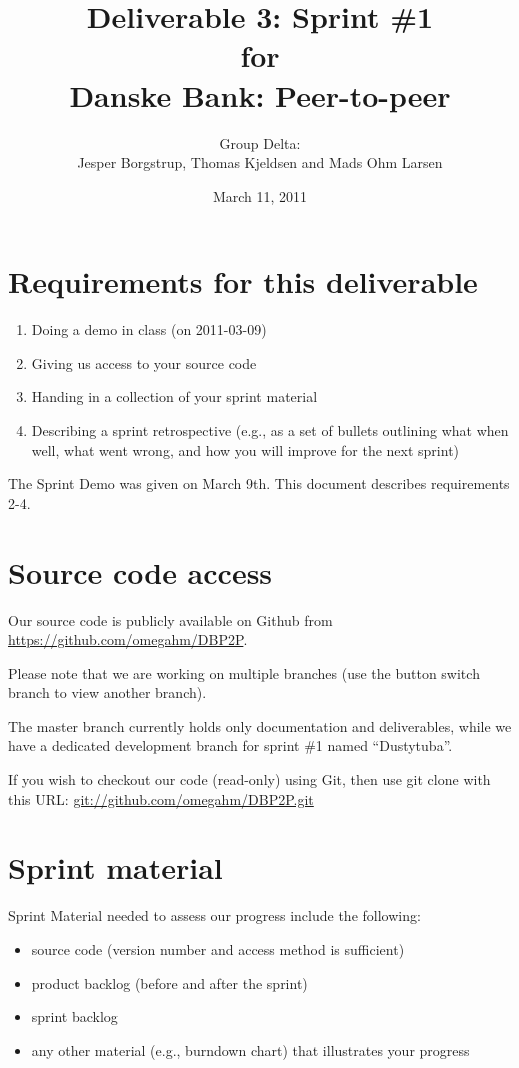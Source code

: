 \documentclass[a4paper,11pt]{article}
\title{Deliverable 3: Sprint \#1\\\small{for}\\\small{Danske Bank: Peer-to-peer}}
\author{ Group Delta:\\Jesper Borgstrup, Thomas Kjeldsen and Mads Ohm Larsen }
\date{March 11, 2011}
\begin{document}
\ifpdf
{}
\else
{}
\fi

\maketitle


\section{Requirements for this deliverable}
\begin{enumerate}
\item Doing a demo in class (on 2011-03-09)
\item Giving us access to your source code
\item Handing in a collection of your sprint material
\item Describing a sprint retrospective (e.g., as a set of bullets outlining what
when well, what went wrong, and how you will improve for the next sprint)
\end{enumerate}

The Sprint Demo was given on March 9th. This document describes requirements 2-4.

\section{Source code access}
Our source code is publicly available on Github from \url{https://github.com/omegahm/DBP2P}.

Please note that we are working on multiple branches (use the button switch branch to view another branch).

The master branch currently holds only documentation and deliverables, while we have a dedicated development branch for sprint \#1 named ``Dustytuba''.

If you wish to checkout our code (read-only) using Git, then use git clone with this URL:
\url{git://github.com/omegahm/DBP2P.git}


\section{Sprint material}
Sprint Material needed to assess our progress include the following:
\begin{itemize}
\item source code (version number and access method is sufficient)
\item product backlog (before and after the sprint)
\item sprint backlog
\item any other material (e.g., burndown chart) that illustrates your progress
\end{itemize}
\end{document}
